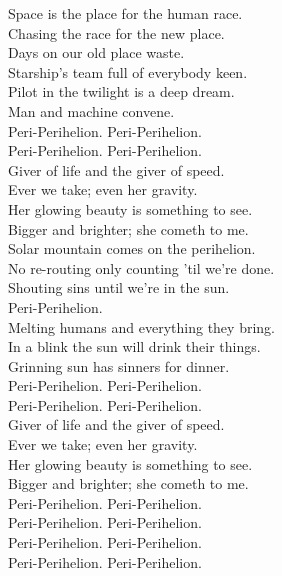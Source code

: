 
Space is the place for the human race. \\
Chasing the race for the new place. \\
Days on our old place waste. \\
Starship's team full of everybody keen. \\
Pilot in the twilight is a deep dream. \\
Man and machine convene. \\

Peri-Perihelion. Peri-Perihelion. \\
Peri-Perihelion. Peri-Perihelion. \\

Giver of life and the giver of speed. \\
Ever we take; even her gravity. \\
Her glowing beauty is something to see. \\
Bigger and brighter; she cometh to me. \\

Solar mountain comes on the perihelion. \\
No re-routing only counting 'til we're done. \\
Shouting sins until we're in the sun. \\
Peri-Perihelion. \\
Melting humans and everything they bring. \\
In a blink the sun will drink their things. \\
Grinning sun has sinners for dinner. \\

Peri-Perihelion. Peri-Perihelion. \\
Peri-Perihelion. Peri-Perihelion. \\

Giver of life and the giver of speed. \\
Ever we take; even her gravity. \\
Her glowing beauty is something to see. \\
Bigger and brighter; she cometh to me. \\

Peri-Perihelion. Peri-Perihelion. \\
Peri-Perihelion. Peri-Perihelion. \\
Peri-Perihelion. Peri-Perihelion. \\
Peri-Perihelion. Peri-Perihelion. \\

